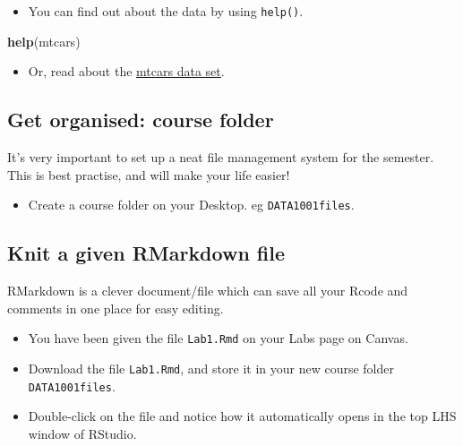 \documentclass[]{article}
\newenvironment{Shaded}{\begin{snugshade}}{\end{snugshade}}
\newcommand{\KeywordTok}[1]{\textcolor[rgb]{0.13,0.29,0.53}{\textbf{#1}}}
\newcommand{\NormalTok}[1]{#1}
\providecommand{\tightlist}{%
  \setlength{\itemsep}{0pt}\setlength{\parskip}{0pt}}
\begin{document}
\begin{itemize}
\tightlist
\item
  You can find out about the data by using \texttt{help()}.
\end{itemize}

\begin{Shaded}
\begin{Highlighting}[]
\KeywordTok{help}\NormalTok{(mtcars)}
\end{Highlighting}
\end{Shaded}

\begin{itemize}
\tightlist
\item
  Or, read about the \href{https://stat.ethz.ch/R-manual/R-devel/library/datasets/html/mtcars.html}{mtcars data set}.
\end{itemize}

\hypertarget{get-organised-course-folder}{%
\subsection{Get organised: course folder}\label{get-organised-course-folder}}

It's very important to set up a neat file management system for the semester. This is best practise, and will make your life easier!

\begin{itemize}
\tightlist
\item
  Create a course folder on your Desktop. eg \texttt{DATA1001files}.
\end{itemize}

\hypertarget{knit-a-given-rmarkdown-file}{%
\subsection{Knit a given RMarkdown file}\label{knit-a-given-rmarkdown-file}}

RMarkdown is a clever document/file which can save all your Rcode and comments in one place for easy editing.

\begin{itemize}
\item
  You have been given the file \texttt{Lab1.Rmd} on your Labs page on Canvas.
\item
  Download the file \texttt{Lab1.Rmd}, and store it in your new course folder \texttt{DATA1001files}.
\end{itemize}

\begin{itemize}
\tightlist
\item
  Double-click on the file and notice how it automatically opens in the top LHS window of RStudio.
\end{itemize}
\end{document}
